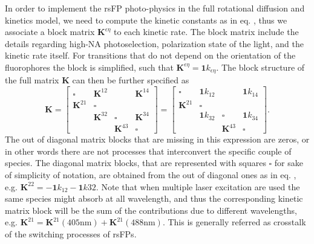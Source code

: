 \documentclass{article}
\begin{document}
In order to implement the rsFP photo-physics in the full rotational diffusion and kinetics model, we need to compute the kinetic constants as in eq. , thus we associate a block matrix $\mathbf{K}^{\epsilon\eta}$ to each kinetic rate. The block matrix include the details regarding high-NA photoselection, polarization state of the light, and the kinetic rate itself. For transitions that do not depend on the orientation of the fluorophores the block is simplified, such that $\mathbf{K}^{\epsilon\eta} = \mathbf{1}k_{\epsilon\eta} $. The block structure of the full matrix $\mathbf{K}$ can then be further specified as
\begin{equation}\label{eq:K_4states}
    \mathbf{K} =
    \begin{bmatrix}
    \square & \mathbf{K}^{12} &   & \mathbf{K}^{14} \\
    \mathbf{K}^{21} & \square \\
        & \mathbf{K}^{32} & \square  & \mathbf{K}^{34} \\
        &   &   \mathbf{K}^{43}  & \square
    \end{bmatrix}
    =
    \begin{bmatrix}
    \square & \mathbf{1}k_{12} &   & \mathbf{1}k_{14} \\
    \mathbf{K}^{21} & \square \\
        & \mathbf{1}k_{32} & \square  & \mathbf{1}k_{34} \\
        &   &   \mathbf{K}^{43}  & \square
    \end{bmatrix}.
\end{equation}
The out of diagonal matrix blocks that are missing in this expression are zeros, or in other words there are not processes that interconvert the specific couple of species. The diagonal matrix blocks, that are represented with squares $\square$ for sake of simplicity of notation, are obtained from the out of diagonal ones as in eq. , e.g. $\mathbf{K}^{22} = - \mathbf{1}k_{12} - \mathbf{1}k{32}$.
Note that when multiple laser excitation are used the same species might absorb at all wavelength, and thus the corresponding kinetic matrix block will be the sum of the contributions due to different wavelengths, e.g. $\mathbf{K}^{21} = \mathbf{K}^{21}(405\text{nm}) + \mathbf{K}^{21}(488\text{nm})$. This is generally referred as crosstalk of the switching processes of rsFPs.
\end{document}
